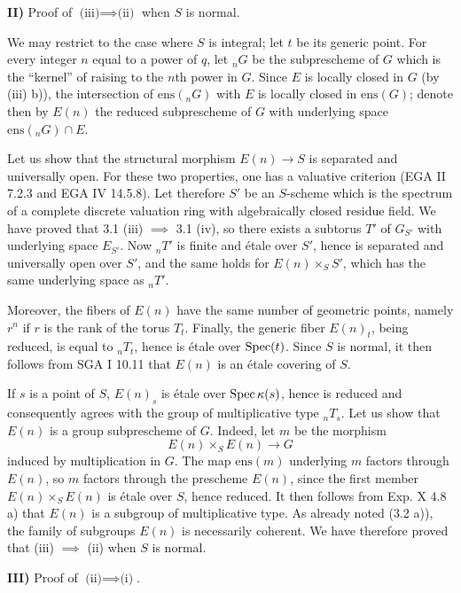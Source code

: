 \noindent\textbf{II)} Proof of $\text{(iii)}\implies\text{(ii)}$ when $S$ is normal.

We may restrict to the case where $S$ is integral; let $t$ be its generic point. For every integer $n$ equal to a power of $q$, let ${}_nG$ be the subprescheme of $G$ which is the ``kernel'' of raising to the $n$th power in $G$. Since $E$ is locally closed in $G$ (by (iii) b)), the intersection of $\mathrm{ens}({}_nG)$ with $E$ is locally closed in $\mathrm{ens}(G)$; denote then by $E(n)$ the reduced subprescheme of $G$ with underlying space $\mathrm{ens}({}_nG)\cap E$.

Let us show that the structural morphism $E(n)\to S$ is separated and universally open. For these two properties, one has a valuative criterion (EGA II 7.2.3 and EGA IV 14.5.8). Let therefore $S'$ be an $S$-scheme which is the spectrum of a complete discrete valuation ring with algebraically closed residue field. We have proved that 3.1 (iii) $\implies$ 3.1 (iv), so there exists a subtorus $T'$ of $G_{S'}$ with underlying space $E_{S'}$. Now ${}_nT'$ is finite and \'etale over $S'$, hence is separated and universally open over $S'$, and the same holds for $E(n)\times_S S'$, which has the same underlying space as ${}_nT'$.

Moreover, the fibers of $E(n)$ have the same number of geometric points, namely $r^n$ if $r$ is the rank of the torus $T_t$. Finally, the generic fiber $E(n)_t$, being reduced, is equal to ${}_nT_t$, hence is \'etale over $\operatorname{Spec}(t)$. Since $S$ is normal, it then follows from SGA I 10.11 that $E(n)$ is an \'etale covering of $S$.

If $s$ is a point of $S$, $E(n)_s$ is \'etale over $\operatorname{Spec}\kappa(s)$, hence is reduced and consequently agrees with the group of multiplicative type ${}_nT_s$. Let us show that $E(n)$ is a group subprescheme of $G$. Indeed, let $m$ be the morphism
\[
E(n)\times_S E(n)\to G
\]
induced by multiplication in $G$. The map $\mathrm{ens}(m)$ underlying $m$ factors through $E(n)$, so $m$ factors through the prescheme $E(n)$, since the first member $E(n)\times_S E(n)$ is \'etale over $S$, hence reduced. It then follows from Exp. X 4.8 a) that $E(n)$ is a subgroup of multiplicative type. As already noted (3.2 a)), the family of subgroups $E(n)$ is necessarily coherent. We have therefore proved that (iii) $\implies$ (ii) when $S$ is normal.

\noindent\textbf{III)} Proof of $\text{(ii)}\implies\text{(i)}$.

